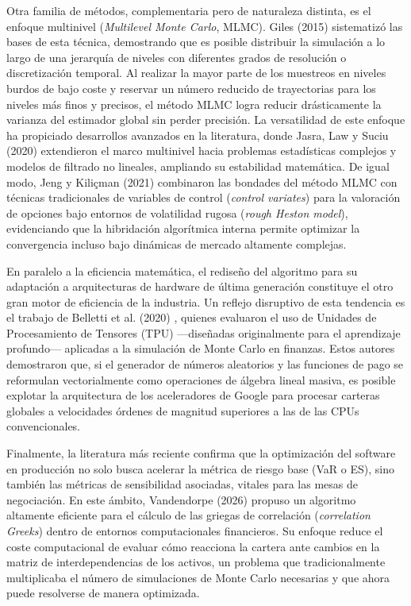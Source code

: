 \documentclass[11pt]{article}
\begin{document}
Otra familia de métodos, complementaria pero de naturaleza distinta, es el enfoque multinivel (\textit{Multilevel Monte Carlo}, MLMC). Giles (2015) \cite{giles2015multilevel} sistematizó las bases de esta técnica, demostrando que es posible distribuir la simulación a lo largo de una jerarquía de niveles con diferentes grados de resolución o discretización temporal. Al realizar la mayor parte de los muestreos en niveles burdos de bajo coste y reservar un número reducido de trayectorias para los niveles más finos y precisos, el método MLMC logra reducir drásticamente la varianza del estimador global sin perder precisión. La versatilidad de este enfoque ha propiciado desarrollos avanzados en la literatura, donde Jasra, Law y Suciu (2020) \cite{jasra2020advanced} extendieron el marco multinivel hacia problemas estadísticas complejos y modelos de filtrado no lineales, ampliando su estabilidad matemática. De igual modo, Jeng y Kiliçman (2021) \cite{jeng2021multilevel} combinaron las bondades del método MLMC con técnicas tradicionales de variables de control (\textit{control variates}) para la valoración de opciones bajo entornos de volatilidad rugosa (\textit{rough Heston model}), evidenciando que la hibridación algorítmica interna permite optimizar la convergencia incluso bajo dinámicas de mercado altamente complejas.

En paralelo a la eficiencia matemática, el rediseño del algoritmo para su adaptación a arquitecturas de hardware de última generación constituye el otro gran motor de eficiencia de la industria. Un reflejo disruptivo de esta tendencia es el trabajo de Belletti et al. (2020) \cite{belletti2020tensor}, quienes evaluaron el uso de Unidades de Procesamiento de Tensores (TPU) —diseñadas originalmente para el aprendizaje profundo— aplicadas a la simulación de Monte Carlo en finanzas. Estos autores demostraron que, si el generador de números aleatorios y las funciones de pago se reformulan vectorialmente como operaciones de álgebra lineal masiva, es posible explotar la arquitectura de los aceleradores de Google para procesar carteras globales a velocidades órdenes de magnitud superiores a las de las CPUs convencionales.

Finalmente, la literatura más reciente confirma que la optimización del software en producción no solo busca acelerar la métrica de riesgo base (VaR o ES), sino también las métricas de sensibilidad asociadas, vitales para las mesas de negociación. En este ámbito, Vandendorpe (2026) \cite{vandendorpe2026efficient} propuso un algoritmo altamente eficiente para el cálculo de las griegas de correlación (\textit{correlation Greeks}) dentro de entornos computacionales financieros. Su enfoque reduce el coste computacional de evaluar cómo reacciona la cartera ante cambios en la matriz de interdependencias de los activos, un problema que tradicionalmente multiplicaba el número de simulaciones de Monte Carlo necesarias y que ahora puede resolverse de manera optimizada.
\end{document}

